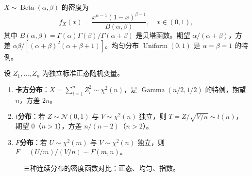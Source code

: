 \begin{definition}[贝塔分布]\label{def:beta_distribution}
$X \sim \operatorname{Beta}(\alpha, \beta)$ 的密度为
\[
f_X(x) = \frac{x^{\alpha-1} (1-x)^{\beta-1}}{B(\alpha, \beta)}, \quad x \in (0, 1),
\]
其中 $B(\alpha, \beta) = \Gamma(\alpha)\Gamma(\beta)/\Gamma(\alpha+\beta)$ 是贝塔函数。期望 $\alpha/(\alpha+\beta)$，方差 $\alpha\beta/[(\alpha+\beta)^2(\alpha+\beta+1)]$。均匀分布 $\operatorname{Uniform}(0,1)$ 是 $\alpha = \beta = 1$ 的特例。
\end{definition}

\begin{definition}\label{def:chi2_t_f}
设 $Z_1, \dots, Z_n$ 为独立标准正态随机变量。
\begin{enumerate}[label=(\roman*)]
    \item \textbf{卡方分布}：$X = \sum_{i=1}^n Z_i^2 \sim \chi^2(n)$，是 $\operatorname{Gamma}(n/2, 1/2)$ 的特例，期望 $n$，方差 $2n$。
    \item \textbf{$t$分布}：若 $Z \sim \mathcal{N}(0,1)$ 与 $V \sim \chi^2(n)$ 独立，则 $T = Z/\sqrt{V/n} \sim t(n)$，期望 $0$（$n > 1$），方差 $n/(n-2)$（$n > 2$）。
    \item \textbf{$F$分布}：若 $U \sim \chi^2(m)$ 与 $V \sim \chi^2(n)$ 独立，则 $F = (U/m)/(V/n) \sim F(m, n)$。
\end{enumerate}
\end{definition}

\begin{figure}[htbp]
\centering
{}
\caption{三种连续分布的密度函数对比：正态、均匀、指数。}
\label{fig:continuous_pdf}
\end{figure}

